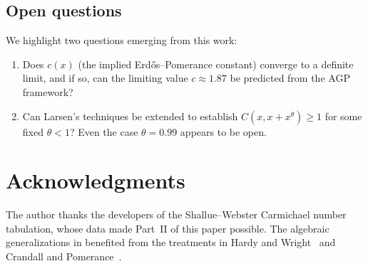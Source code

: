\documentclass[12pt]{amsart}
\theoremstyle{plain}
\theoremstyle{definition}
\theoremstyle{remark}
\begin{document}
\subsection*{Open questions}

We highlight two questions emerging from this work:

\begin{enumerate}
\item Does $c(x)$ (the implied Erd\H{o}s--Pomerance constant)
  converge to a definite limit, and if so, can the limiting value
  $c\approx 1.87$ be predicted from the AGP framework?

\item Can Larsen's techniques be extended to establish
  $C(x,x+x^{\theta})\ge 1$ for some fixed $\theta<1$?  Even the
  case $\theta=0.99$ appears to be open.
\end{enumerate}


\section*{Acknowledgments}

The author thanks the developers of the Shallue--Webster Carmichael
number tabulation, whose data made Part~II of this paper possible.
The algebraic generalizations in  benefited from
the treatments in Hardy and Wright~\cite{hardywright} and
Crandall and Pomerance~\cite{crandallpomerance}.




\end{document}
